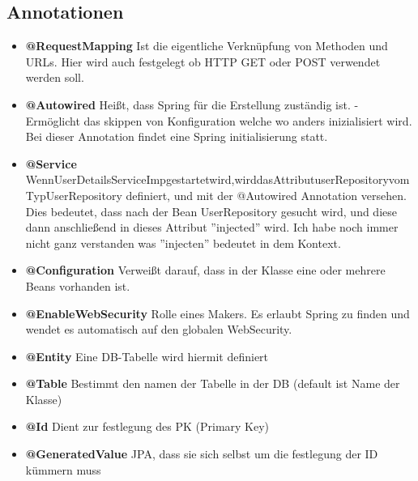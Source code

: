     \subsection{Annotationen}
        \begin{itemize}
            \item \textbf{@RequestMapping}
            \subitem Ist die eigentliche Verknüpfung von Methoden und URLs. Hier wird auch festgelegt ob HTTP GET oder POST verwendet werden soll.
            
            \item \textbf{@Autowired}
            \subitem Heißt, dass Spring für die Erstellung zuständig ist. - Ermöglicht das skippen von Konfiguration welche wo anders inizialisiert wird. Bei dieser Annotation findet eine Spring initialisierung statt.
            
            \item \textbf{@Service}
            \subitem WennUserDetailsServiceImpgestartetwird,wirddasAttributuserRepositoryvomTypUserRepository deﬁniert, und mit der @Autowired Annotation versehen. Dies bedeutet, dass nach der Bean UserRepository gesucht wird, und diese dann anschließend in dieses Attribut ”injected” wird. Ich habe noch immer nicht ganz verstanden was ”injecten” bedeutet in dem Kontext.
            
            \item \textbf{@Configuration}
	        \subitem Verweißt darauf, dass in der Klasse eine oder mehrere Beans vorhanden ist. 
	        
            \item\textbf{@EnableWebSecurity}
	        \subitem Rolle eines Makers. Es erlaubt Spring zu finden und wendet es automatisch auf den globalen WebSecurity. 
	        
	        \item \textbf{@Entity} 
	        \subitem Eine DB-Tabelle wird hiermit deﬁniert 
	        
	        \item \textbf{@Table} 
	        \subitem Bestimmt den namen der Tabelle in der DB (default ist Name der Klasse) 
	        
	        \item \textbf{@Id} 
	        \subitem Dient zur festlegung des PK (Primary Key)
            
            \item \textbf{@GeneratedValue} 
            \subitemagt JPA, dass sie sich selbst um die festlegung der ID kümmern muss 
            

\end{itemize}
